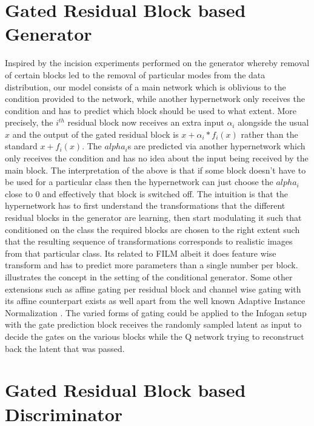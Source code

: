 \section{Gated Residual Block based Generator}
Inspired by the incision experiments performed on the generator whereby removal of certain blocks led to the removal of particular modes from the data distribution, our model consists of a main network which is oblivious to the condition provided to the network, while another hypernetwork only receives the condition and has to predict which block should be used to what extent. More precisely, the $i^{th}$ residual block now receives an extra input $\alpha_i$ alongside the usual $x$ and the output of the gated residual block is $x+\alpha_i*f_i(x)$ rather than the standard $x+f_i(x)$. The $alpha_i$s are predicted via another hypernetwork which only receives the condition and has no idea about the input being received by the main block. The interpretation of the above is that if some block doesn't have to be used for a particular class then the hypernetwork can just choose the $alpha_i$ close to 0 and effectively that block is switched off. The intuition is that the hypernetwork has to first understand the transformations that the different residual blocks in the generator are learning, then start modulating it such that conditioned on the class the required blocks are chosen to the right extent such that the resulting sequence of transformations corresponds to realistic images from that particular class. Its related to FILM \cite{perez2017film} albeit it does feature wise transform and has to predict more parameters than a single number per block.  illustrates the concept in the setting of the conditional generator. Some other extensions such as affine gating per residual block and channel wise gating with its affine counterpart exists as well apart from the well known Adaptive Instance Normalization \cite{huang2017arbitrary} . The varied forms of gating could be applied to the Infogan setup with the gate prediction block receives the randomly sampled latent as input to decide the gates on the various blocks while the Q network trying to reconstruct back the latent that was passed.
 
\section{Gated Residual Block based Discriminator}

